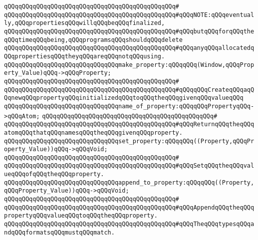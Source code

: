 \verb|qQQqqQQqqQQqqQQqqQQqqQQqqQQqqQQqqQQqqQQqqQQqqQQq#|\newline
\verb|qQQqqQQqqQQqqQQqqQQqqQQqqQQqqQQqqQQqqQQqqQQqqQQq#qQQqNOTE:qQQqeventually,qQQqpropertiesqQQqwillqQQqbeqQQqfinalized,|\newline
\verb|qQQqqQQqqQQqqQQqqQQqqQQqqQQqqQQqqQQqqQQqqQQqqQQq#qQQqbutqQQqforqQQqtheqQQqtimeqQQqbeing,qQQqprogramsqQQqshouldqQQqdelete|\newline
\verb|qQQqqQQqqQQqqQQqqQQqqQQqqQQqqQQqqQQqqQQqqQQqqQQq#qQQqanyqQQqallocatedqQQqpropertiesqQQqtheyqQQqareqQQqnotqQQqusing.|\newline
\newline
\newline
\verb|qQQqqQQqqQQqqQQqqQQqqQQqqQQqqQQqmake_property:qQQqqQQq(Window,qQQqProperty_Value)qQQq->qQQqProperty;|\newline
\verb|qQQqqQQqqQQqqQQqqQQqqQQqqQQqqQQqqQQqqQQqqQQqqQQq#|\newline
\verb|qQQqqQQqqQQqqQQqqQQqqQQqqQQqqQQqqQQqqQQqqQQqqQQq#qQQqqQQqCreateqQQqaqQQqnewqQQqpropertyqQQqinitializedqQQqtoqQQqtheqQQqgivenqQQqvalueqQQq|\newline
\newline
\verb|qQQqqQQqqQQqqQQqqQQqqQQqqQQqqQQqname_of_property:qQQqqQQqPropertyqQQq->qQQqAtom;|\newline
\verb|qQQqqQQqqQQqqQQqqQQqqQQqqQQqqQQqqQQqqQQqqQQqqQQq#|\newline
\verb|qQQqqQQqqQQqqQQqqQQqqQQqqQQqqQQqqQQqqQQqqQQqqQQq#qQQqReturnqQQqtheqQQqatomqQQqthatqQQqnamesqQQqtheqQQqgivenqQQqproperty.|\newline
\newline
\verb|qQQqqQQqqQQqqQQqqQQqqQQqqQQqqQQqset_property:qQQqqQQq((Property,qQQqProperty_Value))qQQq->qQQqVoid;|\newline
\verb|qQQqqQQqqQQqqQQqqQQqqQQqqQQqqQQqqQQqqQQqqQQqqQQq#|\newline
\verb|qQQqqQQqqQQqqQQqqQQqqQQqqQQqqQQqqQQqqQQqqQQqqQQq#qQQqSetqQQqtheqQQqvalueqQQqofqQQqtheqQQqproperty.|\newline
\newline
\verb|qQQqqQQqqQQqqQQqqQQqqQQqqQQqqQQqappend_to_property:qQQqqQQq((Property,qQQqProperty_Value))qQQq->qQQqVoid;|\newline
\verb|qQQqqQQqqQQqqQQqqQQqqQQqqQQqqQQqqQQqqQQqqQQqqQQq#|\newline
\verb|qQQqqQQqqQQqqQQqqQQqqQQqqQQqqQQqqQQqqQQqqQQqqQQq#qQQqAppendqQQqtheqQQqpropertyqQQqvalueqQQqtoqQQqtheqQQqproperty.|\newline
\verb|qQQqqQQqqQQqqQQqqQQqqQQqqQQqqQQqqQQqqQQqqQQqqQQq#qQQqTheqQQqtypesqQQqandqQQqformatsqQQqmustqQQqmatch.|\newline
